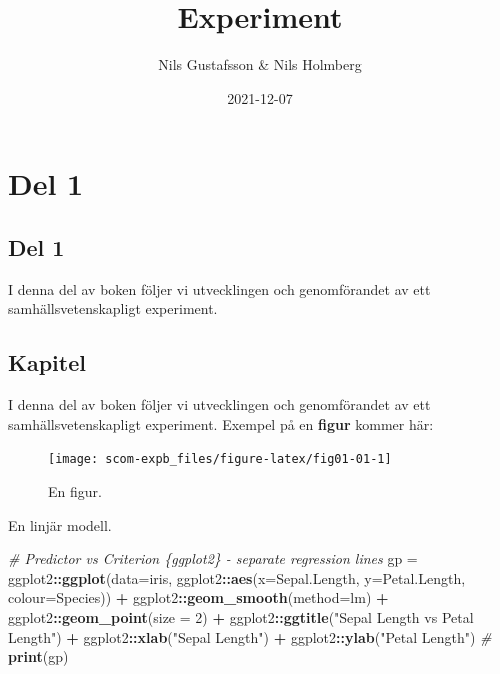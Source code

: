 \documentclass[
]{book}
\title{Experiment}
\author{Nils Gustafsson \& Nils Holmberg}
\date{2021-12-07}
\newenvironment{Shaded}{\begin{snugshade}}{\end{snugshade}}
\newcommand{\CommentTok}[1]{\textcolor[rgb]{0.56,0.35,0.01}{\textit{#1}}}
\newcommand{\DataTypeTok}[1]{\textcolor[rgb]{0.13,0.29,0.53}{#1}}
\newcommand{\DecValTok}[1]{\textcolor[rgb]{0.00,0.00,0.81}{#1}}
\newcommand{\KeywordTok}[1]{\textcolor[rgb]{0.13,0.29,0.53}{\textbf{#1}}}
\newcommand{\NormalTok}[1]{#1}
\newcommand{\OperatorTok}[1]{\textcolor[rgb]{0.81,0.36,0.00}{\textbf{#1}}}
\newcommand{\StringTok}[1]{\textcolor[rgb]{0.31,0.60,0.02}{#1}}
\begin{document}
\maketitle

{
\setcounter{tocdepth}{1}
\tableofcontents
}
\hypertarget{part-del-1}{%
\part{Del 1}\label{part-del-1}}

\hypertarget{del-1}{%
\chapter*{Del 1}\label{del-1}}

I denna del av boken följer vi utvecklingen och genomförandet av ett samhällsvetenskapligt experiment.

\hypertarget{chap01}{%
\chapter{Kapitel}\label{chap01}}

I denna del av boken följer vi utvecklingen och genomförandet av ett samhällsvetenskapligt experiment. Exempel på en \textbf{figur} kommer här:

\begin{figure}

{\centering \texttt{[image: scom-expb\_files/figure-latex/fig01-01-1]} 

}

\caption{En figur.}\label{fig:fig01-01}
\end{figure}

En linjär modell.

\begin{Shaded}
\begin{Highlighting}[]
\CommentTok{\# Predictor vs Criterion \{ggplot2\} {-} separate regression lines}
\NormalTok{gp =}\StringTok{ }\NormalTok{ggplot2}\OperatorTok{::}\KeywordTok{ggplot}\NormalTok{(}\DataTypeTok{data=}\NormalTok{iris, }
\NormalTok{ggplot2}\OperatorTok{::}\KeywordTok{aes}\NormalTok{(}\DataTypeTok{x=}\NormalTok{Sepal.Length,}
\DataTypeTok{y=}\NormalTok{Petal.Length,}
\DataTypeTok{colour=}\NormalTok{Species)) }\OperatorTok{+}\StringTok{ }
\NormalTok{ggplot2}\OperatorTok{::}\KeywordTok{geom\_smooth}\NormalTok{(}\DataTypeTok{method=}\NormalTok{lm) }\OperatorTok{+}\StringTok{ }
\NormalTok{ggplot2}\OperatorTok{::}\KeywordTok{geom\_point}\NormalTok{(}\DataTypeTok{size =} \DecValTok{2}\NormalTok{) }\OperatorTok{+}
\NormalTok{ggplot2}\OperatorTok{::}\KeywordTok{ggtitle}\NormalTok{(}\StringTok{"Sepal Length vs Petal Length"}\NormalTok{) }\OperatorTok{+}
\NormalTok{ggplot2}\OperatorTok{::}\KeywordTok{xlab}\NormalTok{(}\StringTok{"Sepal Length"}\NormalTok{) }\OperatorTok{+}\StringTok{ }\NormalTok{ggplot2}\OperatorTok{::}\KeywordTok{ylab}\NormalTok{(}\StringTok{"Petal Length"}\NormalTok{)}
\CommentTok{\#}
\KeywordTok{print}\NormalTok{(gp)}
\end{Highlighting}
\end{Shaded}
\end{document}
